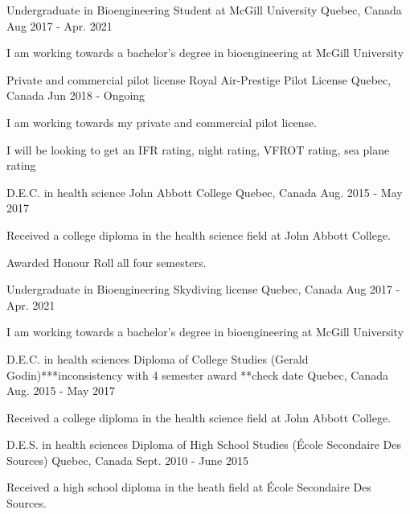 
\begin{cventries}
\cventry
    {Undergraduate in Bioengineering}
    {Student at McGill University}
    {Quebec, Canada}
    {Aug 2017 - Apr. 2021}
    {
      \begin{cvitems}
        \item {I am working towards a bachelor's degree in bioengineering at McGill University}
      \end{cvitems}
    }    \newline

    \cventry
    {Private and commercial pilot license}
    {Royal Air-Prestige Pilot License}
    {Quebec, Canada}
    {Jun 2018 - Ongoing}
    {
      \begin{cvitems}
        \item {I am working towards my private and commercial pilot license.}
        \item {I will be looking to get an IFR rating, night rating, VFROT rating, sea plane rating}
      \end{cvitems}
    }    \newline

  \cventry
    {D.E.C. in health science}
    {John Abbott College}
    {Quebec, Canada}
    {Aug. 2015 - May 2017}
    {
      \begin{cvitems}
        \item {Received a college diploma in the health science field at John Abbott College.}
        \item {Awarded Honour Roll all four semesters.}
      \end{cvitems}
    }\newline
    
    \cventry
    {Undergraduate in Bioengineering}
    {Skydiving license}
    {Quebec, Canada}
    {Aug 2017 - Apr. 2021}
    {
      \begin{cvitems}
        \item {I am working towards a bachelor's degree in bioengineering at McGill University}
      \end{cvitems}
    }\newline
    
    \cventry
    {D.E.C. in health sciences}
    {Diploma of College Studies (Gerald Godin)***inconsistency with 4 semester award **check date}
    {Quebec, Canada}
    {Aug. 2015 - May 2017}
    {
      \begin{cvitems}
        \item {Received a college diploma in the health science field at John Abbott College.}
      \end{cvitems}
    }\newline
    
    \cventry
    {D.E.S. in health sciences}
    {Diploma of High School Studies (École Secondaire Des Sources)}
    {Quebec, Canada}
    {Sept. 2010 - June 2015}
    {
      \begin{cvitems}
        \item {Received a high school diploma in the heath field at École Secondaire Des Sources.}
      \end{cvitems}
    }\newline
\end{cventries}
